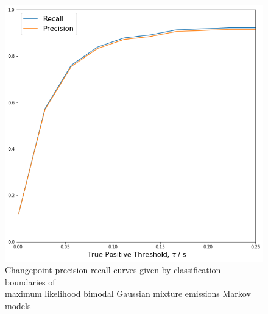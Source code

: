 \documentclass{article}[12pt]
\numberwithin{equation}{section}
\begin{document}
\begin{figure}[H]
\centering{}
\captionsetup{justification=centering}
\includegraphics[scale=0.42]{pr2}
\caption{
Changepoint precision-recall curves given by classification boundaries of\\
maximum likelihood bimodal Gaussian mixture emissions Markov models
}
\label{fig:pr2}
\end{figure}
\end{document}
